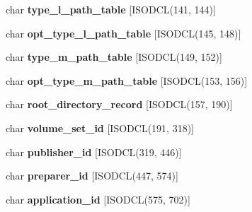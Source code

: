 \begin{DoxyCompactItemize}
\item 
\mbox{\label{structiso__primary__descriptor_af379d280569f21710124a0e1775e3878}} 
char {\bfseries type\+\_\+l\+\_\+path\+\_\+table} \mbox{[}I\+S\+O\+D\+CL(141, 144)\mbox{]}
\item 
\mbox{\label{structiso__primary__descriptor_aa2f49b176a574233831bf2067edf8e01}} 
char {\bfseries opt\+\_\+type\+\_\+l\+\_\+path\+\_\+table} \mbox{[}I\+S\+O\+D\+CL(145, 148)\mbox{]}
\item 
\mbox{\label{structiso__primary__descriptor_a11cb3805aa57ad3234745146e7db805a}} 
char {\bfseries type\+\_\+m\+\_\+path\+\_\+table} \mbox{[}I\+S\+O\+D\+CL(149, 152)\mbox{]}
\item 
\mbox{\label{structiso__primary__descriptor_aeb333e62ba6c0ee6b56cf26acacb9537}} 
char {\bfseries opt\+\_\+type\+\_\+m\+\_\+path\+\_\+table} \mbox{[}I\+S\+O\+D\+CL(153, 156)\mbox{]}
\item 
\mbox{\label{structiso__primary__descriptor_a543c310f8dc38c74d907f6b24d28cddf}} 
char {\bfseries root\+\_\+directory\+\_\+record} \mbox{[}I\+S\+O\+D\+CL(157, 190)\mbox{]}
\item 
\mbox{\label{structiso__primary__descriptor_aa0b4461106d157b2f41ed2153e6d88a1}} 
char {\bfseries volume\+\_\+set\+\_\+id} \mbox{[}I\+S\+O\+D\+CL(191, 318)\mbox{]}
\item 
\mbox{\label{structiso__primary__descriptor_a42af020eac07974ec733d3a82cc3ef77}} 
char {\bfseries publisher\+\_\+id} \mbox{[}I\+S\+O\+D\+CL(319, 446)\mbox{]}
\item 
\mbox{\label{structiso__primary__descriptor_ae69307fff4a238bbff4cd08693b83b8f}} 
char {\bfseries preparer\+\_\+id} \mbox{[}I\+S\+O\+D\+CL(447, 574)\mbox{]}
\item 
\mbox{\label{structiso__primary__descriptor_a6b7eaa77fe38ee51c55febb1ded08834}} 
char {\bfseries application\+\_\+id} \mbox{[}I\+S\+O\+D\+CL(575, 702)\mbox{]}

\end{DoxyCompactItemize}
